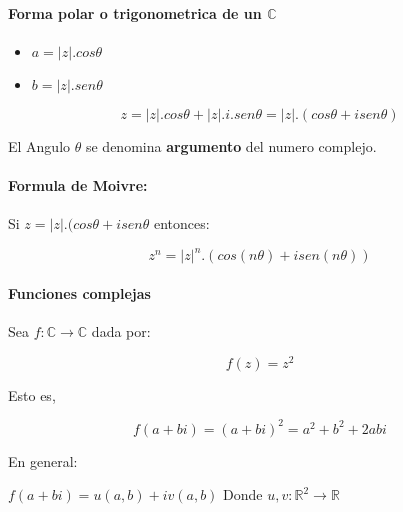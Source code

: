 \documentclass[10pt]{article}
\begin{document}
\paragraph{Forma polar o trigonometrica de un $\mathbb{C}$}

\begin{itemize}
	\item $a = |z|.cos \theta$
	\item $b = |z|.sen \theta$
\end{itemize}

\begin{equation*}
	z = |z|.cos\theta + |z|.i.sen\theta = |z|.(cos\theta+isen\theta) 
\end{equation*}

El Angulo $\theta$ se denomina \textbf{argumento} del numero complejo.\\

\paragraph{Formula de Moivre: }

Si $z = |z|.(cos\theta+isen\theta$ entonces:

\begin{equation*}
	z^n = |z|^n.(cos(n\theta)+isen(n\theta))
\end{equation*}

\paragraph{Funciones complejas}

Sea $f:\mathbb{C}\rightarrow\mathbb{C}$ dada por:

\begin{equation*}
	f(z) = z^2
\end{equation*}

Esto es,

\begin{equation*}
	f(a+bi) = (a+bi)^2 = a^2+b^2+2abi
\end{equation*}

En general:

\begin{center}
	$f(a+bi) = u(a,b)+ iv(a,b)$ Donde $u,v: \mathbb{R}^2 \rightarrow \mathbb{R}$ 
\end{center}
\end{document}
